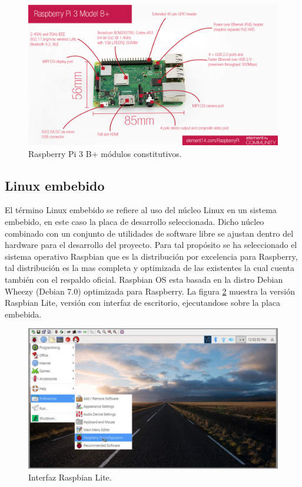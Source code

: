 \begin{figure}[h]
	\centering
	\includegraphics[scale=.3]{./Figures/rasp.png}
	\caption{Raspberry Pi 3 B+ módulos constitutivos.}
	\label{fig:rasp}
\end{figure}
 
 \subsection{Linux embebido}
 El término Linux embebido se refiere al uso del núcleo Linux en un sistema embebido, en este caso la placa de desarrollo seleccionada.
Dicho núcleo combinado con un conjunto de utilidades de software libre  se ajustan dentro del hardware para el desarrollo del proyecto.
Para tal propósito se ha seleccionado el sistema operativo Raspbian que es la distribución por excelencia para Raspberry, tal distribución es la mas completa y optimizada de las existentes la cual cuenta también con el respaldo oficial.
Raspbian OS esta basada en la distro Debian Wheezy (Debian 7.0) optimizada para Raspberry.
La figura \ref{fig:raspbian} muestra la versión Raspbian Lite, versión con interfaz de escritorio, ejecutandose sobre la placa embebida.

\begin{figure}[h]
	\centering
	\includegraphics[scale=.3]{./Figures/raspbian.png}
	\caption{Interfaz Raspbian Lite.}
	\label{fig:raspbian}
\end{figure}

